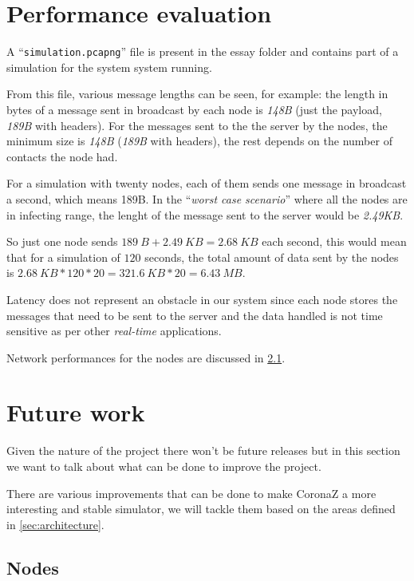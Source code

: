 \documentclass[conference]{IEEEtran}
\begin{document}
\section{Performance evaluation}\label{sec:performance}

	A ``\texttt{simulation.pcapng}'' file is present in the essay folder and contains part of a simulation for the system system running.

	From this file, various message lengths can be seen, for example: the length in bytes of a message sent in broadcast by each node is \textit{148B} (just the payload, \textit{189B} with headers).
	For the messages sent to the the server by the nodes, the minimum size is \textit{148B} (\textit{189B} with headers), the rest depends on the number of contacts the node had.
	
	For a simulation with twenty nodes, each of them sends one message in broadcast a second, which means 189B.
	In the ``\textit{worst case scenario}'' where all the nodes are in infecting range, the lenght of the message sent to the server would be \textit{2.49KB}.
	
	So just one node sends $189~B + 2.49~KB = 2.68~KB$ each second, this would mean that for a simulation of $120$ seconds, the total amount of data sent by the nodes is $2.68~KB*120*20 = 321.6~KB*20 = 6.43~MB$.
	
	Latency does not represent an obstacle in our system since each node stores the messages that need to be sent to the server and the data handled is not time sensitive as per other \textit{real-time} applications.
	
	Network performances for the nodes are discussed in \ref{subsec:nodes_improvements}.

\section{Future work}\label{sec:future_work}

	Given the nature of the project there won't be future releases but in this section we want to talk about what can be done to improve the project.
	
	There are various improvements that can be done to make CoronaZ a more interesting and stable simulator, we will tackle them based on the areas defined in \ref{sec:architecture}.
	
	\subsection{Nodes}\label{subsec:nodes_improvements}
	
\end{document}
